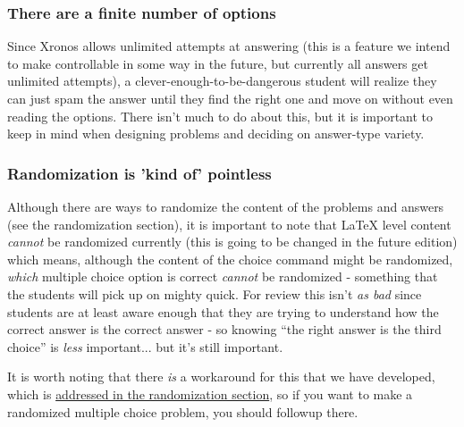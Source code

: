 \documentclass{ximera}
\begin{document}
    \subsubsection*{There are a finite number of options}
        Since Xronos allows unlimited attempts at answering (this is a feature we intend to make controllable in some way in the future, but currently all answers get unlimited attempts), a clever-enough-to-be-dangerous student will realize they can just spam the answer until they find the right one and move on without even reading the options. There isn't much to do about this, but it is important to keep in mind when designing problems and deciding on answer-type variety.
        
    \subsubsection*{Randomization is 'kind of' pointless}
        Although there are ways to randomize the content of the problems and answers (see the randomization section), it is important to note that LaTeX level content \textit{cannot} be randomized currently (this is going to be changed in the future edition) which means, although the content of the choice command might be randomized, \textit{which} multiple choice option is correct \textit{cannot} be randomized - something that the students will pick up on mighty quick. For review this isn't \textit{as bad} since students are at least aware enough that they are trying to understand how the correct answer is the correct answer - so knowing ``the right answer is the third choice'' is \textit{less} important... but it's still important.
        
        It is worth noting that there \textit{is} a workaround for this that we have developed, which is \href{https://xronos.clas.ufl.edu/examples/exampleCore/problemDesign/multipleChoice}{addressed in the randomization section}, so if you want to make a randomized multiple choice problem, you should followup there.
        
        
    
\end{document}
